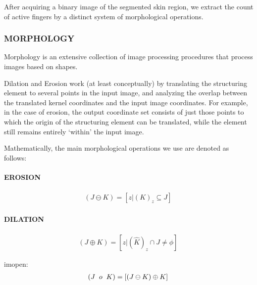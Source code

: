\documentclass[conference]{IEEEtran}
\begin{document}
After acquiring a binary image of the segmented skin region, we extract the count of active fingers by a distinct system of morphological operations.


\subsubsection{MORPHOLOGY}

Morphology is an extensive collection of image processing procedures that process images based on shapes.

 Dilation and Erosion work (at least conceptually) by translating the structuring element to several points in the input image, and analyzing the overlap between the translated kernel coordinates and the input image coordinates. For example, in the case of erosion, the output coordinate set consists of just those points to which the origin of the structuring element can be translated, while the element still remains entirely `within' the input image.

Mathematically, the main morphological operations we use are denoted as follows:

\paragraph{EROSION}
\begin{equation}
\begin{aligned}
\left(J \ominus K\right) = \left[z|(K)_z\subseteq J \right]\,
\end{aligned}
\end{equation}


\paragraph{DILATION}
\begin{equation}
\begin{aligned}
\left(J \oplus K\right) =  \left[z|(\widehat{K})_z\cap J \neq \phi \right]\,
\end{aligned}
\end{equation}

imopen:
\begin{equation}
\begin{aligned}
\left(J \hspace{2mm} o\hspace{2mm} K\right) =  \left[\left(J \ominus K \right) \oplus K \right]\,
\end{aligned}
\end{equation}
\end{document}
